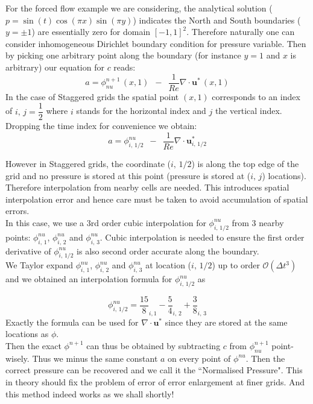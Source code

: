For the forced flow example we are considering, the analytical solution ($p = \sin(t)\cos(\pi x)\sin(\pi y)$) indicates the North and South boundaries ($y=\pm 1$) are essentially zero for domain $[-1,1]^2$. Therefore naturally one can consider inhomogeneous Dirichlet boundary condition for pressure variable. Then by picking one arbitrary point along the boundary (for instance $y=1$ and $x$ is arbitrary) our equation for $c$ reads:
\begin{equation*}
a = \phi^{n+1}_{nu}\,(x,1) \,\,\,-\,\,\, \dfrac{1}{Re} \nabla \cdot \textbf{u}^*\,(x,1)
\end{equation*}
In the case of Staggered grids the spatial point $(x,1)$ corresponds to an index of $i, \, j = \dfrac{1}{2}$ where $i$ stands for the horizontal index and $j$ the vertical index. Dropping the time index for convenience we obtain:
\begin{equation*}
a = \phi^{nu}_{i,\,1/2} \,\,\,-\,\,\, \dfrac{1}{Re} \nabla \cdot \textbf{u}^*_{i,\,1/2}
\end{equation*}

However in Staggered grids, the coordinate ($i,\,1/2$) is along the top edge of the grid and no pressure is stored at this point (pressure is stored at ($i,\,j$) locations). Therefore interpolation from nearby cells are needed. This introduces spatial interpolation error and hence care must be taken to avoid accumulation of spatial errors.\\

In this case, we use a 3rd order cubic interpolation for $\phi^{nu}_{i,\,1/2}$ from 3 nearby points: $\phi^{nu}_{i,\,1}$, $\phi^{nu}_{i,\,2}$ and $\phi^{nu}_{i,\,3}$. Cubic interpolation is needed to ensure the first order derivative of $\phi^{nu}_{i,\,1/2}$ is also second order accurate along the boundary.\\
We Taylor expand $\phi^{nu}_{i,\,1}$, $\phi^{nu}_{i,\,2}$ and $\phi^{nu}_{i,\,3}$ at location ($i,\,1/2$) up to order $\mathcal{O}(\Delta t^3)$ and we obtained an interpolation formula for $\phi^{nu}_{i,\,1/2}$ as

\begin{equation}
\phi^{nu}_{i,\,1/2} = \dfrac{15}{8}_{i,1} - \dfrac{5}{4}_{i,\,2}+\dfrac{3}{8}_{i,\,3}
\end{equation}
Exactly the formula can be used for $\nabla \cdot \textbf{u}^*$ since they are stored at the same locations as $\phi$.\\

Then the exact $\phi^{n+1}$ can thus be obtained by subtracting $c$ from $\phi^{n+1}_{nu}$ point-wisely. Thus we minus the same constant $a$ on every point of $\phi^{nu}$. Then the correct pressure can be recovered and we call it the ``Normalised Pressure". This in theory should fix the problem of error of error enlargement at finer grids. And this method indeed works as we shall shortly!\\

